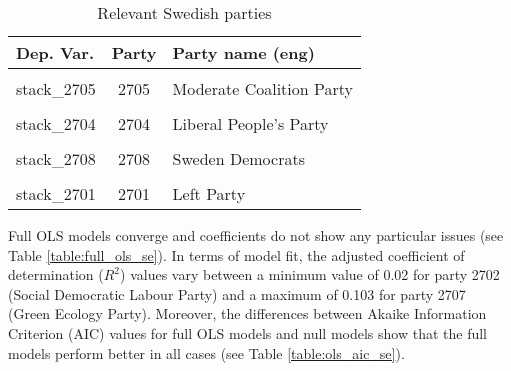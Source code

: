 \documentclass[
]{article}
\begin{document}
\begin{table}[!h]

\caption{\label{tab:unnamed-chunk-175}Relevant Swedish parties \label{table:relprty_tab_se}}
\centering
\begin{tabular}[t]{lcl}
\toprule
Dep. Var. & Party & Party name (eng)\\
\midrule
\cellcolor{gray!6}{stack\_2702} & \cellcolor{gray!6}{2702} & \cellcolor{gray!6}{Social Democratic Labour Party}\\
stack\_2705 & 2705 & Moderate Coalition Party\\
\cellcolor{gray!6}{stack\_2707} & \cellcolor{gray!6}{2707} & \cellcolor{gray!6}{Green Ecology Party}\\
stack\_2704 & 2704 & Liberal People's Party\\
\cellcolor{gray!6}{stack\_2703} & \cellcolor{gray!6}{2703} & \cellcolor{gray!6}{Centre Party}\\
\addlinespace
stack\_2708 & 2708 & Sweden Democrats\\
\cellcolor{gray!6}{stack\_2706} & \cellcolor{gray!6}{2706} & \cellcolor{gray!6}{Christian Democrats}\\
stack\_2701 & 2701 & Left Party\\
\bottomrule
\end{tabular}
\end{table}

Full OLS models converge and coefficients do not show any particular issues (see Table
\ref{table:full_ols_se}).
In terms of model fit, the adjusted coefficient of determination (\(R^2\)) values vary between
a minimum value of 0.02
for party 2702
(Social Democratic Labour Party)
and a maximum of 0.103
for party 2707
(Green Ecology Party).
Moreover, the differences between Akaike Information Criterion (AIC) values for full OLS models and null
models show that the full models perform better in all cases (see Table \ref{table:ols_aic_se}).
\end{document}
